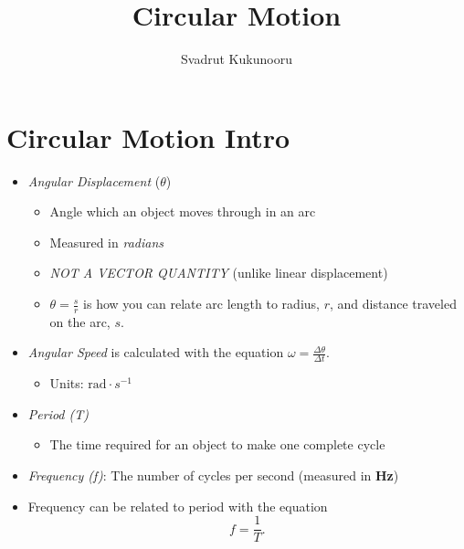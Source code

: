 \documentclass[a4paper]{report}
\title{Circular Motion}
\author{Svadrut Kukunooru}
\begin{document}
    \maketitle
    \section{Circular Motion Intro}
    \begin{itemize}
        \item \textit{Angular Displacement} ($\theta$)
        \begin{itemize}
            \item Angle which an object moves through in an arc
            \item Measured in \textit{radians}
            \item \textit{NOT A VECTOR QUANTITY} (unlike linear displacement)
            \item $\theta = \frac{s}{r}$ is how you can relate arc length to radius, $r$, and distance traveled on the arc, $s$. 
        \end{itemize}
        \item \textit{Angular Speed} is calculated with the equation $\omega = \frac{\Delta \theta}{\Delta t}$. 
            \begin{itemize}
                \item Units: $\text{rad} \cdot s^{-1}$
            \end{itemize}
        \item \textit{Period (T)}
            \begin{itemize}
                \item The time required for an object to make one complete cycle
            \end{itemize}
        \item \textit{Frequency (f)}: The number of cycles per second (measured in \textbf{Hz})
        \item Frequency can be related to period with the equation
            \[
            f = \frac{1}{T}
            .\] 
    \end{itemize}
\end{document}
